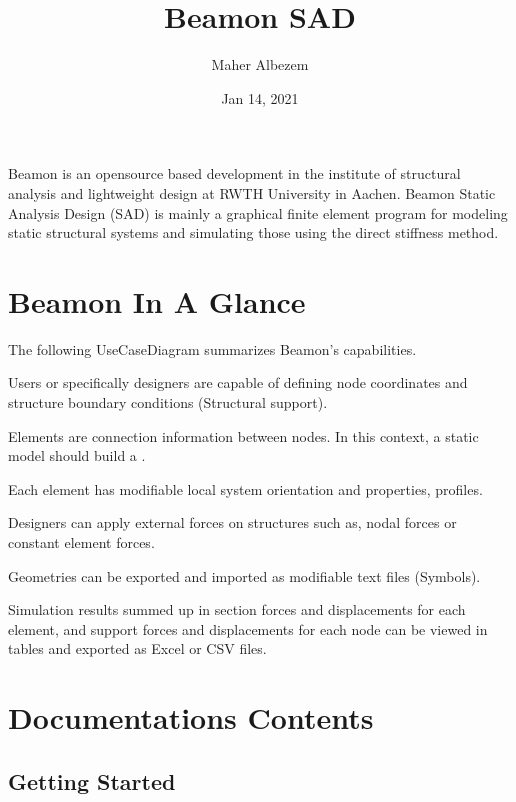 \documentclass[letterpaper,10pt,english]{sphinxmanual}
\title{Beamon SAD}
\date{Jan 14, 2021}
\author{Maher Albezem}
\begin{document}
\pagestyle{empty}
\sphinxmaketitle
\pagestyle{plain}
\sphinxtableofcontents
\pagestyle{normal}
\label{\detokenize{index::doc}}


Beamon is an open\sphinxhyphen{}source based development in the institute of structural analysis and
lightweight design at RWTH University in Aachen. Beamon Static Analysis Design (SAD) is mainly
a graphical finite element program for modeling static structural systems and simulating those using
the direct stiffness method.


\chapter{Beamon In A Glance}
\label{\detokenize{index:beamon-in-a-glance}}
The following Use\sphinxhyphen{}Case\sphinxhyphen{}Diagram summarizes Beamon’s capabilities.

\noindent{}

Users or specifically designers are capable of defining node coordinates and structure boundary conditions (Structural support).

Elements are connection information between nodes. In this context, a static model should build a
.

Each element has modifiable local system orientation and properties, profiles.

Designers can apply external forces on structures such as, nodal forces or constant element forces.

Geometries can be exported and imported as modifiable text files
(\sphinxhyphen{}Symbols).

Simulation results summed up in section forces and displacements for each element, and support forces and displacements
for each node can be viewed in tables and exported as Excel or CSV files.


\chapter{Documentations Contents}
\label{\detokenize{index:documentations-contents}}

\section{Getting Started}
\label{\detokenize{getting_started:getting-started}}\label{\detokenize{getting_started::doc}}
\end{document}
